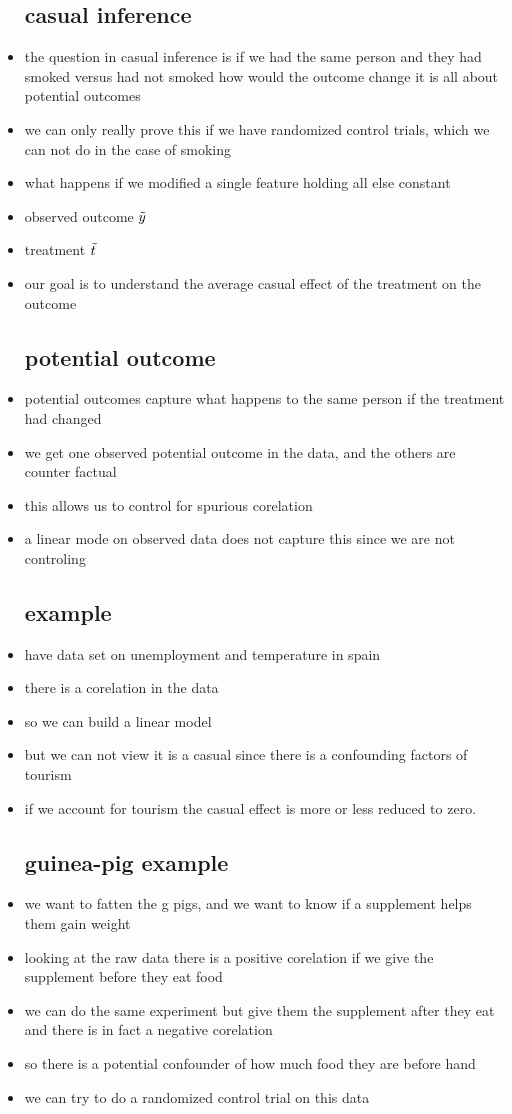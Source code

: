 \documentclass{article}
\begin{document}
\begin{itemize}
\subsection*{casual inference}
\item the question in casual inference is if we had the same person and they had smoked versus had not smoked how would 
the outcome change it is all about potential outcomes
\item we can only really prove this if we have randomized control trials, which we can not do in the case of smoking 
\item what happens if we modified a single feature holding all else constant 
\item observed outcome $\Tilde{y}$
\item treatment $\Tilde{t}$
\item our goal is to understand the average casual effect of the treatment on the outcome
\subsection*{potential outcome}
\item potential outcomes capture what happens to the same person if the treatment had changed
\item we get one observed potential outcome in the data, and the others are counter factual 
\item this allows us to control for spurious  corelation
\item a linear mode on observed data does not capture this since we are not controling 
\subsection*{example}
\item have data set on unemployment and temperature in spain 
\item there is a corelation in the data 
\item so we can build a linear model 
\item but we can not view it is a casual since there is a confounding factors of tourism
\item if we account for tourism the casual effect is more or less reduced to zero. 
\subsection*{guinea-pig example}
\item we want to fatten the g pigs, and we want to know if a supplement helps them gain weight 
\item looking at the raw data there is a positive corelation if we give the supplement before they eat food
\item we can do the same experiment but give them the supplement after they eat and there is in fact a negative corelation
\item so there is a potential confounder of how much food they are before hand 
\item we can try to do a randomized control trial on this data

\end{itemize}
\end{document}
